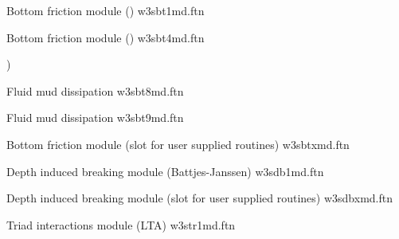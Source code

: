 \noindent
Bottom friction module (\js) \hfill {\file w3sbt1md.ftn}

\begin{flisti}
\end{flisti}

\noindent
Bottom friction module (\showex) \hfill {\file w3sbt4md.ftn}

\begin{flisti}
)
\end{flisti}

\noindent
Fluid mud dissipation \citep{art:DL78}  \hfill {\file w3sbt8md.ftn}

\begin{flisti}
\end{flisti}

\pb \noindent
Fluid mud dissipation \citep{art:Ng00}  \hfill {\file w3sbt9md.ftn}

\begin{flisti}
\end{flisti}

\noindent
Bottom friction module (slot for user supplied routines) \hfill {\file
w3sbtxmd.ftn}

\begin{flisti}
\end{flisti}

\noindent
Depth induced breaking module (Battjes-Janssen) \hfill {\file w3sdb1md.ftn}

\begin{flisti}
\end{flisti}

\noindent
Depth induced breaking module (slot for user supplied routines) \hfill {\file
w3sdbxmd.ftn}

\begin{flisti}
\end{flisti}

\noindent
Triad interactions module (LTA) \hfill {\file w3str1md.ftn}

\begin{flisti}
\end{flisti}

